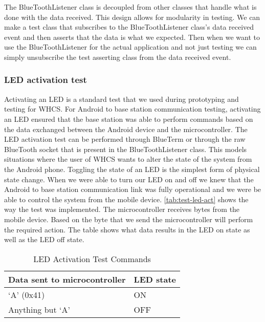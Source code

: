 The BlueToothListener class is decoupled from other classes that handle what is
done with the data received. This design allows for modularity in testing.
We can make a test class that subscribes to the BlueToothListener class{}'s
data received event and then asserts that the data is what we expected. Then
when we want to use the BlueToothListener for the actual application and not
just testing we can simply unsubscribe the test asserting class from the data
received event.

\subsubsection{LED activation test}
Activating an LED is a standard test that we used during prototyping and
testing for WHCS. For Android to base station communication testing, activating
an LED ensured that the base station was able to perform commands based on the
data exchanged between the Android device and the microcontroller. The LED
activation test can be performed through BlueTerm or through the raw BlueTooth
socket that is present in the BlueToothListener class. This models
situations where the user of WHCS wants to alter the state of the system from
the Android phone. Toggling the state of an LED is the simplest form of
physical state change. When we were able to turn our LED on and off we knew that
the Android to base station communication link was fully operational and we were
be able to control the system from the mobile device.  \autoref{tab:test-led-act}
shows the way the test was implemented. The microcontroller receives
bytes from the mobile device. Based on the byte that we send the
microcontroller will perform the required action. The table shows what data
results in the LED on state as well as the LED off state.

\begin{table}[H]
\centering
\begin{tabular}{|l|l|}
\hline
{\color{black} Data sent to microcontroller} &
{\color{black} LED state}\\\hline
{\color{black} {}`A{}' (0x41)} &
{\color{black} ON}\\\hline
{\color{black} Anything but {}`A{}'} &
{\color{black} OFF}\\\hline
\end{tabular}
\caption{LED Activation Test Commands}
\label{tab:test-led-act}
\end{table}
